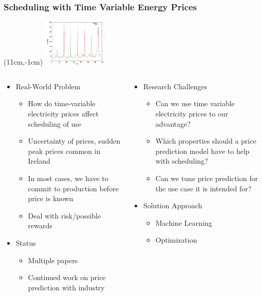 \begin{frame}
\frametitle{Scheduling with Time Variable Energy Prices}
\begin{textblock*}{3cm}(11cm,-1cm)
\includegraphics[width=3cm]{images/price}
\end{textblock*}
\vspace{0.8cm}
\begin{columns}[b]
\begin{column}{0.5\textwidth}
\begin{itemize}
\item Real-World Problem
\begin{itemize}
\item How do time-variable electricity prices affect scheduling of use
\item Uncertainty of prices, sudden peak prices common in Ireland
\item In most cases, we have to commit to production before price is known
\item Deal with risk/possible rewards
\end{itemize}
\item Status
\begin{itemize}
\item Multiple papers 
\item Continued work on price prediction with industry
\end{itemize}
\end{itemize}
\end{column}
\begin{column}{0.5\textwidth}
\begin{itemize}
\item Research Challenges
\begin{itemize}
\item Can we use time variable electricity prices to our advantage?
\item Which properties should a price prediction model have to help with scheduling?
\item Can we tune price prediction for the use case it is intended for?
\end{itemize}
\item Solution Approach
\begin{itemize}
\item Machine Learning
\item Optimization
\end{itemize}
\end{itemize}
\end{column}
\end{columns}
\end{frame}

